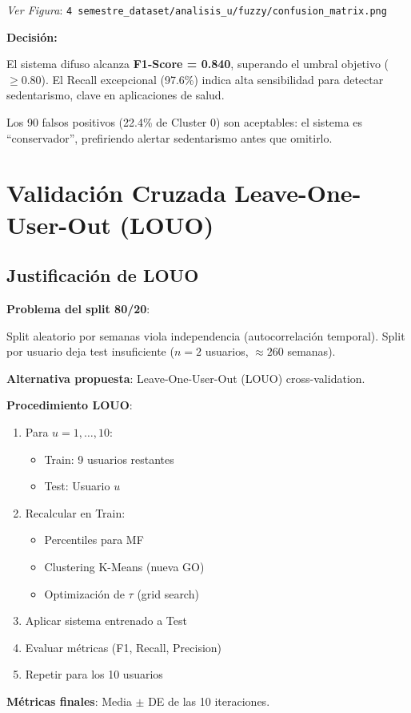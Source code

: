 \documentclass[12pt,letterpaper,twoside]{report}
\begin{document}
\textit{Ver Figura}: \texttt{4 semestre\_dataset/analisis\_u/fuzzy/confusion\_matrix.png}

\begin{decisionbox}
\textbf{Decisión:}

El sistema difuso alcanza \textbf{F1-Score = 0.840}, superando el umbral objetivo ($\geq 0.80$). El Recall excepcional (97.6\%) indica alta sensibilidad para detectar sedentarismo, clave en aplicaciones de salud.

Los 90 falsos positivos (22.4\% de Cluster 0) son aceptables: el sistema es ``conservador'', prefiriendo alertar sedentarismo antes que omitirlo.
\end{decisionbox}

\section{Validación Cruzada Leave-One-User-Out (LOUO)}

\subsection{Justificación de LOUO}

\begin{hipotesisbox}
\textbf{Problema del split 80/20}:

Split aleatorio por semanas viola independencia (autocorrelación temporal). Split por usuario deja test insuficiente ($n=2$ usuarios, $\approx 260$ semanas).

\textbf{Alternativa propuesta}: Leave-One-User-Out (LOUO) cross-validation.
\end{hipotesisbox}

\begin{estadisticobox}
\textbf{Procedimiento LOUO}:

\begin{enumerate}[noitemsep]
    \item Para $u = 1, \ldots, 10$:
    \begin{itemize}[noitemsep]
        \item Train: 9 usuarios restantes
        \item Test: Usuario $u$
    \end{itemize}
    \item Recalcular en Train:
    \begin{itemize}[noitemsep]
        \item Percentiles para MF
        \item Clustering K-Means (nueva GO)
        \item Optimización de $\tau$ (grid search)
    \end{itemize}
    \item Aplicar sistema entrenado a Test
    \item Evaluar métricas (F1, Recall, Precision)
    \item Repetir para los 10 usuarios
\end{enumerate}

\textbf{Métricas finales}: Media $\pm$ DE de las 10 iteraciones.
\end{estadisticobox}
\end{document}
